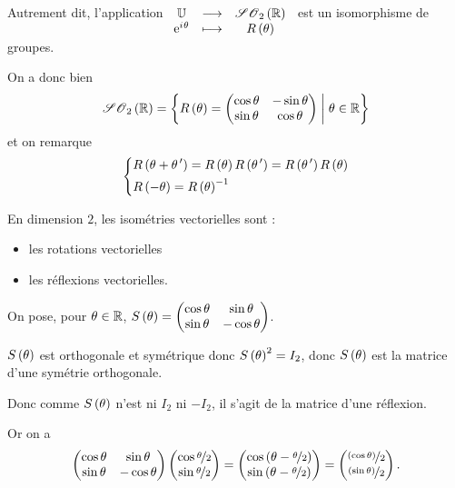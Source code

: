 Autrement dit, l'application \(\fonctionlambda{\U}{\SO{2}[\R]}{\e{\i\theta}}{R\paren{\theta}}\) est un isomorphisme de groupes.

\begin{dem}
On a donc bien \[\SO{2}[\R]=\accol{R\paren{\theta}=\begin{pmatrix}\cos\theta & -\sin\theta \\ \sin\theta & \cos\theta\end{pmatrix}\tq\theta\in\R}\] et on remarque \[\begin{dcases}
R\left(\theta+\theta^{\,\prime}\right)=R\left(\theta\right)R\left(\theta^{\,\prime}\right)=R\left(\theta^{\,\prime}\right)R\left(\theta\right) \\
R\left(-\theta\right)=R\left(\theta\right)^{-1}
\end{dcases}\]
\end{dem}

\begin{prop}
En dimension \(2\), les isométries vectorielles sont :

\begin{itemize}
    \item les rotations vectorielles \\
    \item les réflexions vectorielles.
\end{itemize}
\end{prop}

\begin{rem}
On pose, pour \(\theta\in\mathbb{R}\), \(S\left(\theta\right)=\begin{pmatrix}
\cos\theta & \sin\theta \\
\sin\theta & -\cos\theta
\end{pmatrix}\).

\(S\left(\theta\right)\) est orthogonale et symétrique donc \(S\left(\theta\right)^2=I_2\), donc \(S\left(\theta\right)\) est la matrice d'une symétrie orthogonale.

Donc comme \(S\left(\theta\right)\) n'est ni \(I_2\) ni \(-I_2\), il s'agit de la matrice d'une réflexion.

Or on a \[\begin{pmatrix}
\cos\theta & \sin\theta \\
\sin\theta & -\cos\theta
\end{pmatrix}\begin{pmatrix}\cos\nicefrac{\theta}{2}\\\sin\nicefrac{\theta}{2}\end{pmatrix}=\begin{pmatrix}\cos\left(\theta-\nicefrac{\theta}{2}\right)\\\sin\left(\theta-\nicefrac{\theta}{2}\right)\end{pmatrix}=\begin{pmatrix}\nicefrac{\left(\cos\theta\right)}{2}\\\nicefrac{\left(\sin\theta\right)}{2}\end{pmatrix}.\]
\end{rem}

